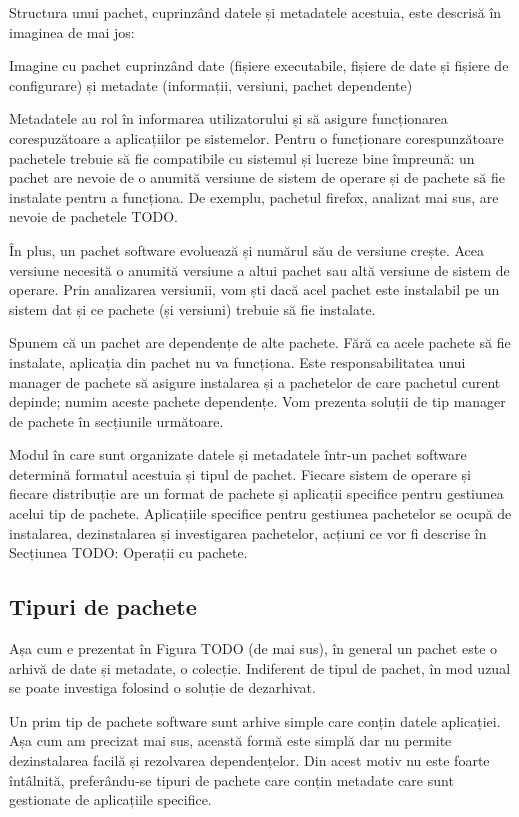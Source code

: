 Structura unui pachet, cuprinzând datele și metadatele acestuia, este descrisă în imaginea de mai jos:

Imagine cu pachet cuprinzând date (fișiere executabile, fișiere de date și fișiere de configurare) și metadate (informații, versiuni, pachet dependente)

Metadatele au rol în informarea utilizatorului și să asigure funcționarea corespuzătoare a aplicațiilor pe sistemelor. Pentru o funcționare corespunzătoare pachetele trebuie să fie compatibile cu sistemul și lucreze bine împreună: un pachet are nevoie de o anumită versiune de sistem de operare și de pachete să fie instalate pentru a funcționa. De exemplu, pachetul firefox, analizat mai sus, are nevoie de pachetele TODO.

În plus, un pachet software evoluează și numărul său de versiune crește. Acea versiune necesită o anumită versiune a altui pachet sau altă versiune de sistem de operare. Prin analizarea versiunii, vom ști dacă acel pachet este instalabil pe un sistem dat și ce pachete (și versiuni) trebuie să fie instalate.

Spunem că un pachet are dependențe de alte pachete. Fără ca acele pachete să fie instalate, aplicația din pachet nu va funcționa. Este responsabilitatea unui manager de pachete să asigure instalarea și a pachetelor de care pachetul curent depinde; numim aceste pachete dependențe. Vom prezenta soluții de tip manager de pachete în secțiunile următoare.

Modul în care sunt organizate datele și metadatele într-un pachet software determină formatul acestuia și tipul de pachet. Fiecare sistem de operare și fiecare distribuție are un format de pachete și aplicații specifice pentru gestiunea acelui tip de pachete. Aplicațiile specifice pentru gestiunea pachetelor se ocupă de instalarea, dezinstalarea și investigarea pachetelor, acțiuni ce vor fi descrise în Secțiunea TODO: Operații cu pachete.

\subsection{Tipuri de pachete}
\label{sec:package:types}

Așa cum e prezentat în Figura TODO (de mai sus), în general un pachet este o arhivă de date și metadate, o colecție. Indiferent de tipul de pachet, în mod uzual se poate investiga folosind o soluție de dezarhivat.

Un prim tip de pachete software sunt arhive simple care conțin datele aplicației. Așa cum am precizat mai sus, această formă este simplă dar nu permite dezinstalarea facilă și rezolvarea dependențelor. Din acest motiv nu este foarte întâlnită, preferându-se tipuri de pachete care conțin metadate care sunt gestionate de aplicațiile specifice.

